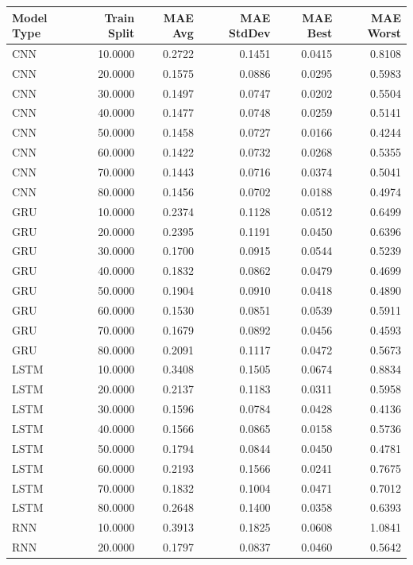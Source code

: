 \begin{tabular}{lrrrrr}
\toprule
Model Type & Train Split & MAE Avg & MAE StdDev & MAE Best & MAE Worst \\
\midrule
CNN & 10.0000 & 0.2722 & 0.1451 & 0.0415 & 0.8108 \\
CNN & 20.0000 & 0.1575 & 0.0886 & 0.0295 & 0.5983 \\
CNN & 30.0000 & 0.1497 & 0.0747 & 0.0202 & 0.5504 \\
CNN & 40.0000 & 0.1477 & 0.0748 & 0.0259 & 0.5141 \\
CNN & 50.0000 & 0.1458 & 0.0727 & 0.0166 & 0.4244 \\
CNN & 60.0000 & 0.1422 & 0.0732 & 0.0268 & 0.5355 \\
CNN & 70.0000 & 0.1443 & 0.0716 & 0.0374 & 0.5041 \\
CNN & 80.0000 & 0.1456 & 0.0702 & 0.0188 & 0.4974 \\
GRU & 10.0000 & 0.2374 & 0.1128 & 0.0512 & 0.6499 \\
GRU & 20.0000 & 0.2395 & 0.1191 & 0.0450 & 0.6396 \\
GRU & 30.0000 & 0.1700 & 0.0915 & 0.0544 & 0.5239 \\
GRU & 40.0000 & 0.1832 & 0.0862 & 0.0479 & 0.4699 \\
GRU & 50.0000 & 0.1904 & 0.0910 & 0.0418 & 0.4890 \\
GRU & 60.0000 & 0.1530 & 0.0851 & 0.0539 & 0.5911 \\
GRU & 70.0000 & 0.1679 & 0.0892 & 0.0456 & 0.4593 \\
GRU & 80.0000 & 0.2091 & 0.1117 & 0.0472 & 0.5673 \\
LSTM & 10.0000 & 0.3408 & 0.1505 & 0.0674 & 0.8834 \\
LSTM & 20.0000 & 0.2137 & 0.1183 & 0.0311 & 0.5958 \\
LSTM & 30.0000 & 0.1596 & 0.0784 & 0.0428 & 0.4136 \\
LSTM & 40.0000 & 0.1566 & 0.0865 & 0.0158 & 0.5736 \\
LSTM & 50.0000 & 0.1794 & 0.0844 & 0.0450 & 0.4781 \\
LSTM & 60.0000 & 0.2193 & 0.1566 & 0.0241 & 0.7675 \\
LSTM & 70.0000 & 0.1832 & 0.1004 & 0.0471 & 0.7012 \\
LSTM & 80.0000 & 0.2648 & 0.1400 & 0.0358 & 0.6393 \\
RNN & 10.0000 & 0.3913 & 0.1825 & 0.0608 & 1.0841 \\
RNN & 20.0000 & 0.1797 & 0.0837 & 0.0460 & 0.5642 \\

\end{tabular}
